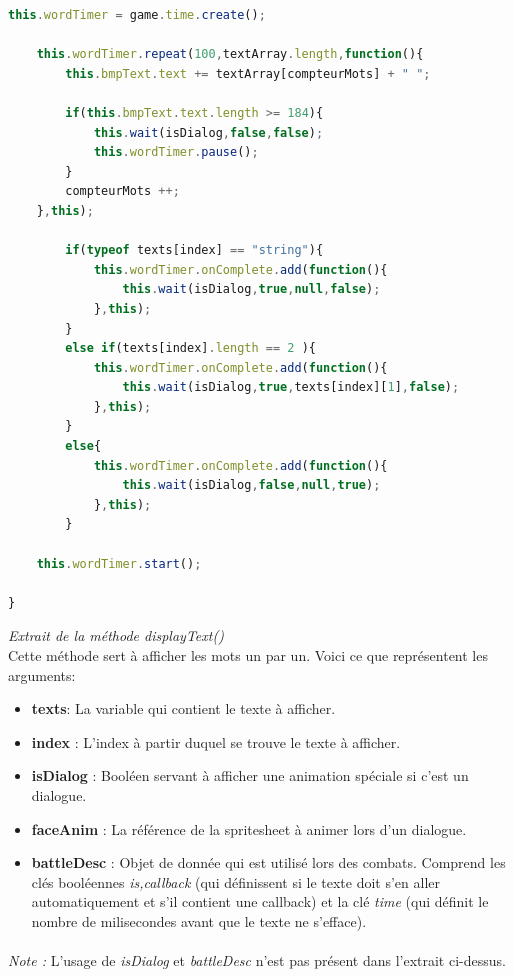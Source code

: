 \documentclass[11pt]{article}
\begin{document}
\begin{appendices}
\begin{lstlisting}[language=JavaScript]
    this.wordTimer = game.time.create();

    this.wordTimer.repeat(100,textArray.length,function(){
        this.bmpText.text += textArray[compteurMots] + " ";

        if(this.bmpText.text.length >= 184){
            this.wait(isDialog,false,false);
            this.wordTimer.pause();
        }
        compteurMots ++;
    },this);
  
        if(typeof texts[index] == "string"){
            this.wordTimer.onComplete.add(function(){
                this.wait(isDialog,true,null,false);
            },this); 
        }
        else if(texts[index].length == 2 ){
            this.wordTimer.onComplete.add(function(){
                this.wait(isDialog,true,texts[index][1],false);
            },this);
        }
        else{
            this.wordTimer.onComplete.add(function(){
                this.wait(isDialog,false,null,true);
            },this);
        }
    
    this.wordTimer.start();

}
\end{lstlisting} 
\textit{Extrait de la méthode displayText()}\\
Cette méthode sert à afficher les mots un par un. Voici ce que représentent les arguments:\\
\begin{itemize}
\item \textbf{texts}: La variable qui contient le texte à afficher.
\item \textbf{index} : L'index à partir duquel se trouve le texte à afficher.
\item \textbf{isDialog} : Booléen servant à afficher une animation spéciale si c'est un dialogue.
\item \textbf{faceAnim} : La référence de la spritesheet à animer lors d'un dialogue.
\item \textbf{battleDesc} : Objet de donnée qui est utilisé lors des combats. Comprend les clés booléennes \textit{is,callback} (qui définissent si le texte doit s'en aller automatiquement et s'il contient une callback) et la clé \textit{time} (qui définit le nombre de milisecondes avant que le texte ne s'efface).
\end{itemize}
\paragraph{}
\textit{Note :} L'usage de \textit{isDialog} et \textit{battleDesc} n'est pas présent dans l'extrait ci-dessus.\\


\end{appendices}
\end{document}
